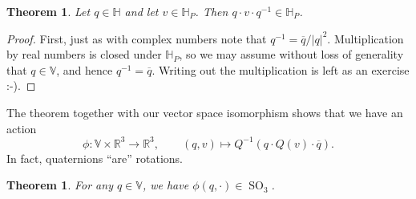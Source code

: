 \documentclass{article}
\newtheorem{theorem}[definition]{Theorem}
\DeclareMathOperator{\SO}{SO}
\begin{document}
\begin{theorem}
Let $q \in \mathbb{H}$ and let $v \in \mathbb{H}_P$. Then $q \cdot v \cdot q^{-1} \in \mathbb{H}_P$.
\end{theorem}
\begin{proof}
First, just as with complex numbers note that $q^{-1} = \overline{q} / |q|^2$. Multiplication by real numbers is closed under $\mathbb{H}_P$, so we may assume without loss of generality that $q \in \mathbb{V}$, and hence $q^{-1} = \overline{q}$. Writing out the multiplication is left as an exercise :-).
\end{proof}
The theorem together with our vector space isomorphism shows that we have an action
\[\phi : \mathbb{V} \times \mathbb{R}^3 \to \mathbb{R}^3, \qquad (q,v) \mapsto Q^{-1} \left( q \cdot Q(v) \cdot \overline{q} \right). \]
In fact, quaternions ``are'' rotations.
\begin{theorem}
For any $q \in \mathbb{V}$, we have $\phi(q, \cdot) \in \SO_3$.
\end{theorem}
\end{document}
